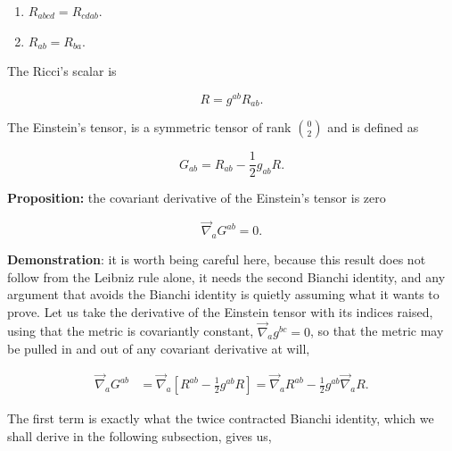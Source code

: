             \begin{enumerate}
                \item $R_{abcd}=R_{cdab}$.
                \item $R_{ab}=R_{ba}$.
            \end{enumerate}

            \begin{myDef}
                The Ricci's scalar is 

                \begin{equation}
                    R = g^{ab}R_{ab}.
                \end{equation}
            \end{myDef}

            \begin{myDef}
                The Einstein's tensor, is a symmetric tensor of rank $\binom{0}{2}$ and is defined as

                \begin{equation}
                    G_{ab}=R_{ab}-\frac{1}{2}g_{ab}R.
                \end{equation}
            \end{myDef}

            \textbf{Proposition:} the covariant derivative of the Einstein's tensor is zero

            \begin{equation}
                \Vec{\nabla}_aG^{ab}=0.
            \end{equation}

            \textbf{Demonstration}: it is worth being careful here, because this result does not follow from the Leibniz rule alone, it needs the second Bianchi identity, and any argument that avoids the Bianchi identity is quietly assuming what it wants to prove. Let us take the derivative of the Einstein tensor with its indices raised, using that the metric is covariantly constant, $\Vec{\nabla}_ag^{bc}=0$, so that the metric may be pulled in and out of any covariant derivative at will,

            \begin{align*}
                \Vec{\nabla}_aG^{ab} &= \Vec{\nabla}_a\left[R^{ab} - \frac{1}{2}g^{ab}R \right] = \Vec{\nabla}_aR^{ab}-\frac{1}{2}g^{ab}\Vec{\nabla}_aR.
            \end{align*}

            The first term is exactly what the twice contracted Bianchi identity, which we shall derive in the following subsection, gives us,

